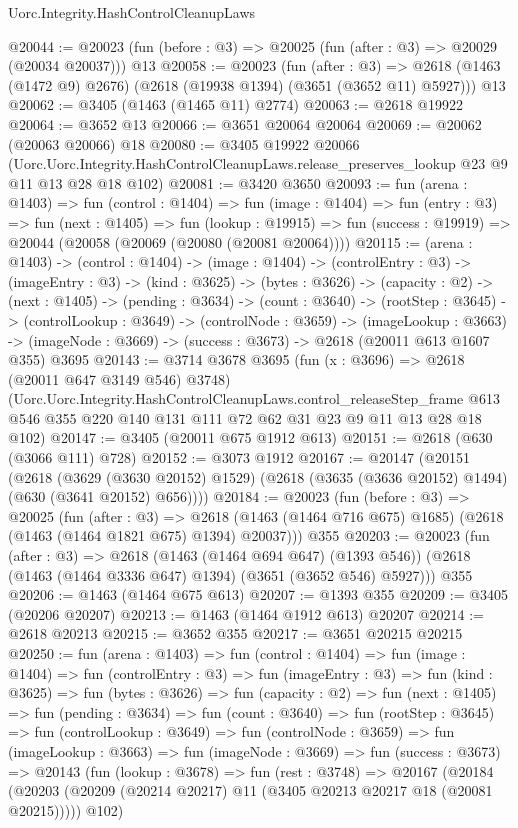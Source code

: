 \begin{lexlean}{Uorc.Integrity.HashControlCleanupLaws}
\begin{coremodule}
@20044 := @20023 (fun (before : @3) => @20025 (fun (after : @3) => @20029 (@20034 @20037))) @13
@20058 := @20023
    (fun (after : @3) =>
    @2618 (@1463 (@1472 @9) @2676) (@2618 (@19938 @1394) (@3651 (@3652 @11) @5927)))
    @13
@20062 := @3405 (@1463 (@1465 @11) @2774)
@20063 := @2618 @19922
@20064 := @3652 @13
@20066 := @3651 @20064 @20064
@20069 := @20062 (@20063 @20066) @18
@20080 := @3405
    @19922
    @20066
    (Uorc.Uorc.Integrity.HashControlCleanupLaws.release_preserves_lookup
      @23
      @9
      @11
      @13
      @28
      @18
      @102)
@20081 := @3420 @3650
@20093 := fun (arena : @1403) =>
  fun (control : @1404) =>
  fun (image : @1404) =>
  fun (entry : @3) =>
  fun (next : @1405) =>
  fun (lookup : @19915) =>
  fun (success : @19919) => @20044 (@20058 (@20069 (@20080 (@20081 @20064))))
@20115 := (arena : @1403) ->
  (control : @1404) ->
  (image : @1404) ->
  (controlEntry : @3) ->
  (imageEntry : @3) ->
  (kind : @3625) ->
  (bytes : @3626) ->
  (capacity : @2) ->
  (next : @1405) ->
  (pending : @3634) ->
  (count : @3640) ->
  (rootStep : @3645) ->
  (controlLookup : @3649) ->
  (controlNode : @3659) ->
  (imageLookup : @3663) ->
  (imageNode : @3669) -> (success : @3673) -> @2618 (@20011 @613 @1607 @355) @3695
@20143 := @3714
    @3678
    @3695
    (fun (x : @3696) => @2618 (@20011 @647 @3149 @546) @3748)
    (Uorc.Uorc.Integrity.HashControlCleanupLaws.control_releaseStep_frame
      @613
      @546
      @355
      @220
      @140
      @131
      @111
      @72
      @62
      @31
      @23
      @9
      @11
      @13
      @28
      @18
      @102)
@20147 := @3405 (@20011 @675 @1912 @613)
@20151 := @2618 (@630 (@3066 @111) @728)
@20152 := @3073 @1912
@20167 := @20147
    (@20151
      (@2618
        (@3629 (@3630 @20152) @1529)
        (@2618 (@3635 (@3636 @20152) @1494) (@630 (@3641 @20152) @656))))
@20184 := @20023
    (fun (before : @3) =>
    @20025
      (fun (after : @3) =>
      @2618 (@1463 (@1464 @716 @675) @1685) (@2618 (@1463 (@1464 @1821 @675) @1394) @20037)))
    @355
@20203 := @20023
    (fun (after : @3) =>
    @2618
      (@1463 (@1464 @694 @647) (@1393 @546))
      (@2618 (@1463 (@1464 @3336 @647) @1394) (@3651 (@3652 @546) @5927)))
    @355
@20206 := @1463 (@1464 @675 @613)
@20207 := @1393 @355
@20209 := @3405 (@20206 @20207)
@20213 := @1463 (@1464 @1912 @613) @20207
@20214 := @2618 @20213
@20215 := @3652 @355
@20217 := @3651 @20215 @20215
@20250 := fun (arena : @1403) =>
  fun (control : @1404) =>
  fun (image : @1404) =>
  fun (controlEntry : @3) =>
  fun (imageEntry : @3) =>
  fun (kind : @3625) =>
  fun (bytes : @3626) =>
  fun (capacity : @2) =>
  fun (next : @1405) =>
  fun (pending : @3634) =>
  fun (count : @3640) =>
  fun (rootStep : @3645) =>
  fun (controlLookup : @3649) =>
  fun (controlNode : @3659) =>
  fun (imageLookup : @3663) =>
  fun (imageNode : @3669) =>
  fun (success : @3673) =>
  @20143
    (fun (lookup : @3678) =>
    fun (rest : @3748) =>
    @20167
      (@20184 (@20203 (@20209 (@20214 @20217) @11 (@3405 @20213 @20217 @18 (@20081 @20215)))))
      @102)
\end{coremodule}
\end{lexlean}

